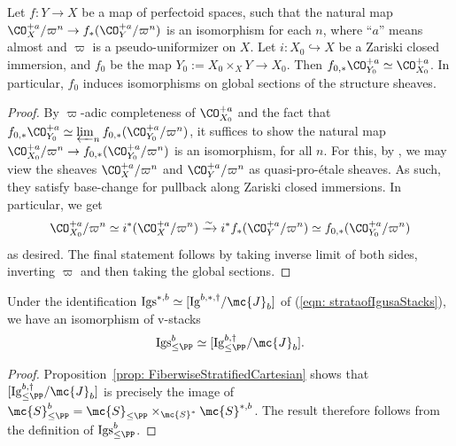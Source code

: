 \documentclass[letterpaper,11pt]{amsart}
\begin{document}
\begin{lemma}[{Cf. \cite[Lemma 4.5.2]{CS2}}]\label{lemma: StrataSteinFactorization}
Let $f: Y\to X$ be a map of perfectoid spaces, such that the natural map $\CO_X^{+a}/\varpi^n\to f_\ast( \CO^{+a}_Y/\varpi^n)$ is an isomorphism for each $n$, where ``$a$'' means almost and $\varpi$ is a pseudo-uniformizer on $X$. Let $i: X_0\hookrightarrow X$ be a Zariski closed immersion, and $f_0$ be the map $Y_0:=X_0\times_X Y\to X_0$. Then $f_{0,\ast}\CO^{+a}_{Y_0}\simeq \CO^{+a}_{X_0}$. In particular, $f_0$ induces isomorphisms on global sections of the structure sheaves. 
\end{lemma}
\begin{proof} 
By $\varpi$-adic completeness of $\CO^{+a}_{X_0}$ and the fact that $f_{0,\ast}\CO^{+a}_{Y_0}\simeq\varprojlim_{n} f_{0,\ast}(\CO^{+a}_{Y_0}/\varpi^n)$, it suffices to show the natural map  $\CO^{+a}_{X_0}/\varpi^n\to f_{0,\ast}(\CO^{+a}_{Y_0}/\varpi^n)$ is an isomorphism, for all $n$. For this, by \cite[Proposition 14.8]{Ecod}, we may view the sheaves $\CO_X^{+a}/\varpi^n$ and $ \CO^{+a}_Y/\varpi^n$ as quasi-pro-\'etale sheaves. As such, they satisfy base-change for pullback along Zariski closed immersions. In particular, we get
\[ \CO^{+a}_{X_0}/\varpi^n\simeq i^\ast(\CO_X^{+a}/\varpi^n)\xrightarrow{\sim}i^\ast f_\ast( \CO^{+a}_Y/\varpi^n)\simeq f_{0,\ast}(\CO^{+a}_{Y_0}/\varpi^n)\]
as desired. The final statement follows by taking inverse limit of both sides, inverting $\varpi$ and then taking the global sections.
\end{proof}


\begin{corollary}\label{cor: IdentificationOfStrata} Under the identification $\mathrm{Igs}^{\ast,b}\simeq [\mathrm{Ig}^{b,\ast,\dagger}/\mc{J}_b]$ of (\ref{eqn: strataofIgusaStacks}), we have an isomorphism of v-stacks
\[
\mathrm{Igs}^{b}_{\leq\PP}\simeq [\mathrm{Ig}^{b,\dagger}_{\leq\PP}/\mc{J}_b].
\]
\end{corollary}

\begin{proof} 
Proposition~\ref{prop: FiberwiseStratifiedCartesian} shows that $[\mathrm{Ig}^{b,\dagger}_{\leq\PP}/\mc{J}_b]$ is precisely the image of $\mc{S}_{\leq \PP}^b=\mc{S}_{\leq \PP}\times_{\mc{S}^\ast} \mc{S}^{\ast,b}$. The result therefore follows from the definition of $\mathrm{Igs}^{b}_{\leq\PP}$.
\end{proof}
\end{document}
